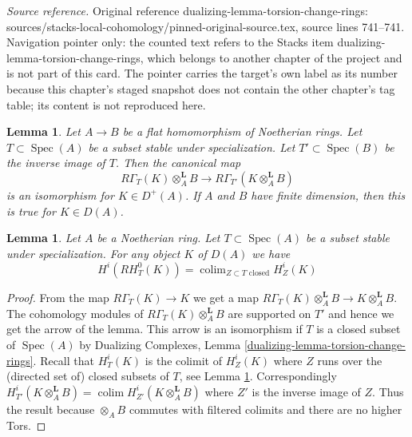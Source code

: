 \documentclass[10pt,a4paper]{amsart}
\theoremstyle{plain}
\newtheorem{lemma}[subsection]{Lemma}
\theoremstyle{definition}
\theoremstyle{remark}
\numberwithin{equation}{subsection}
\def\colim{\mathop{\mathrm{colim}}\nolimits}
\def\Spec{\mathop{\mathrm{Spec}}}
\begin{document}
\noindent\textit{Source reference.} Original reference dualizing-lemma-torsion-change-rings: sources/stacks-local-cohomology/pinned-original-source.tex, source lines 741--741. Navigation pointer only: the counted text refers to the Stacks item dualizing-lemma-torsion-change-rings, which belongs to another chapter of the project and is not part of this card. The pointer carries the target's own label as its number because this chapter's staged snapshot does not contain the other chapter's tag table; its content is not reproduced here.\par\medskip
\begin{lemma}
\label{lemma-torsion-change-rings}
Let $A \to B$ be a flat homomorphism of Noetherian rings.
Let $T \subset \Spec(A)$ be a subset stable under specialization.
Let $T' \subset \Spec(B)$ be the inverse image of $T$.
Then the canonical map
$$
R\Gamma_T(K) \otimes_A^\mathbf{L} B
\longrightarrow
R\Gamma_{T'}(K \otimes_A^\mathbf{L} B)
$$
is an isomorphism for $K \in D^+(A)$. If $A$ and $B$ have finite
dimension, then this is true for $K \in D(A)$.
\end{lemma}

\begin{lemma}
\label{lemma-adjoint-ext}
Let $A$ be a Noetherian ring. Let $T \subset \Spec(A)$
be a subset stable under specialization.
For any object $K$ of $D(A)$ we have
$$
H^i(RH^0_T(K)) = \colim_{Z \subset T\text{ closed}} H^i_Z(K)
$$
\end{lemma}

\begin{proof}
From the map $R\Gamma_T(K) \to K$ we get a map
$R\Gamma_T(K) \otimes_A^\mathbf{L} B \to K \otimes_A^\mathbf{L} B$.
The cohomology modules of $R\Gamma_T(K) \otimes_A^\mathbf{L} B$
are supported on $T'$ and hence we get the arrow of the lemma.
This arrow is an isomorphism if $T$ is a closed subset of $\Spec(A)$ by
Dualizing Complexes, Lemma \ref{dualizing-lemma-torsion-change-rings}.
Recall that $H^i_T(K)$ is the colimit of $H^i_Z(K)$ where $Z$ runs over
the (directed set of) closed subsets of $T$, see
Lemma \ref{lemma-adjoint-ext}.
Correspondingly
$H^i_{T'}(K \otimes_A^\mathbf{L} B) =
\colim H^i_{Z'}(K \otimes_A^\mathbf{L} B)$ where $Z'$ is the inverse
image of $Z$. Thus the result because $\otimes_A B$ commutes
with filtered colimits and there are no higher Tors.
\end{proof}
\end{document}
